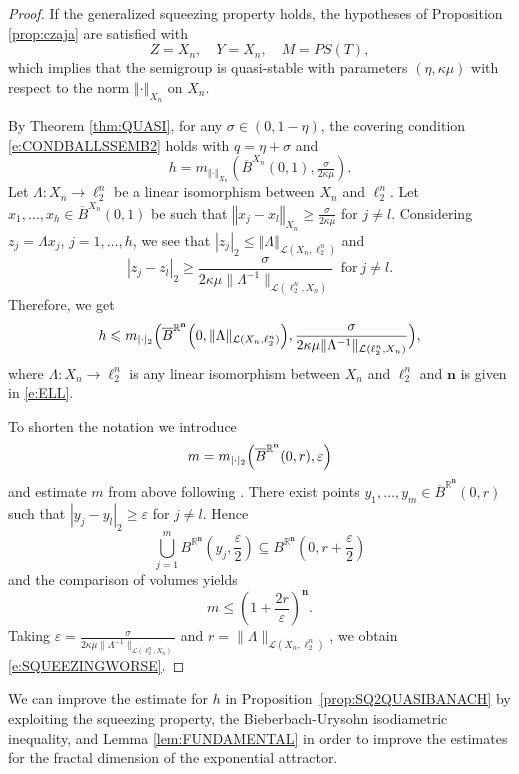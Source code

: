\documentclass[a4paper,12pt,reqno]{amsart}
\theoremstyle{plain}
\theoremstyle{definition}
\numberwithin{equation}{section}
\newcommand{\R}{\mathbb{R}}
\newcommand{\norm}[1]{\left\Vert#1\right\Vert}
\newcommand{\eps}{\varepsilon}
\renewcommand{\geq}{\geqslant}
\renewcommand{\leq}{\leqslant}
\begin{document}
\begin{proof}
If the generalized squeezing property holds, the  hypotheses of Proposition \ref{prop:czaja} are satisfied with 
$$Z=X_n, \quad Y=X_n,\quad M=PS(T),$$ 
which implies that the semigroup is quasi-stable with parameters $(\eta,\kappa\mu)$ with respect to the norm $\norm{\cdot}_{X_n}$ on $X_{n}$.

By Theorem \ref{thm:QUASI}, for any $\sigma\in(0,1-\eta)$, the covering condition \eqref{e:CONDBALLSSEMB2} holds with $q=\eta+\sigma$ and 
$$h=m_{\norm{\cdot}_{X_n}}\left(\overline{B}^{X_n}(0,1),\tfrac{\sigma}{2\kappa\mu}\right).$$
Let $\Lambda\colon X_n\to \ell^n_2$ be a linear isomorphism between $X_n$ and $\ell^n_2$.
Let $x_1,\ldots,x_{h}\in \overline{B}^{X_n}(0,1)$ be such that $\norm{x_j-x_l}_{X_n}\geq\frac{\sigma}{2\kappa\mu}$ for $j\neq l$. Considering $z_j=\Lambda x_j$, $j=1,\ldots,h$, we see that $|z_j|_2\leq\norm{\Lambda}_{\mathcal{L}(X_n,\ell^n_2)}$
and 
$$|z_j-z_l|_2\geq\frac{\sigma}{2\kappa\mu\|\Lambda^{-1}\|_{\mathcal{L}(\ell^n_2,X_n)}}\ \text{ for}\ j\neq l.$$ 
Therefore, we get 
\begin{equation*}
h \leq m_{|\cdot|_2}\Bigl(\overline{B}^{\R^{\mathbf{n}}}\Big(0,\|\Lambda\|_{\mathcal{L}(X_n,\ell^n_2)}\Big),\frac{\sigma}{2\kappa\mu\|\Lambda^{-1}\|_{\mathcal{L}(\ell^n_2,X_n)}}\Bigr),   
\end{equation*}
where $\Lambda\colon X_n\to \ell^{n}_2$ is any linear isomorphism between $X_n$ and $\ell^n_2$ and $\mathbf{n}$ is given in \eqref{e:ELL}.

To shorten the notation we introduce
$$m=m_{|\cdot|_2}\Bigl(\overline{B}^{\R^\mathbf{n}}(0,r),\eps\Bigr)$$
and estimate $m$ from above following \cite[Lemma 3.1.4]{chueshov}. There exist points $y_1,\ldots,y_m\in \overline{B}^{\R^\mathbf{n}}(0,r)$  such that $|y_j-y_l|_{2}\geq\eps$ for $j\neq l$. Hence
$$\bigcup_{j=1}^{m}B^{\R^\mathbf{n}}\left(y_j,\frac{\eps}{2}\right)\subseteq B^{\R^\mathbf{n}}\left(0,r+\frac{\eps}{2}\right)$$
and the comparison of volumes yields 
\begin{equation}\label{e:BOUNDOFM}
m\leq\left(1+\frac{2r}{\eps}\right)^\mathbf{n}.
\end{equation}
Taking $\eps=\frac{\sigma}{2\kappa\mu\|\Lambda^{-1}\|_{\mathcal{L}(\ell^n_2,X_n)}}$
and $r=\|\Lambda\|_{\mathcal{L}(X_n,\ell^n_2)}$, we obtain \eqref{e:SQUEEZINGWORSE}.
\end{proof}

We can improve the estimate  for $h$ in Proposition~\ref{prop:SQ2QUASIBANACH} by exploiting the squeezing property, the Bieberbach-Urysohn isodiametric inequality, and Lemma \ref{lem:FUNDAMENTAL} in order to improve the estimates for the fractal dimension of the exponential attractor. 
\end{document}
